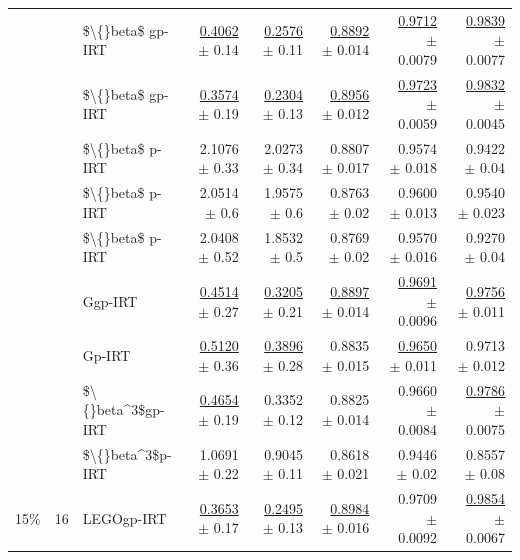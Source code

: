 \begin{longtable}{llp{}rrrrr}
 &  & \$\textbackslash\{\}beta\$ gp-IRT & \underline{0.4062} {\scriptsize $\pm$ 0.14} & \underline{0.2576} {\scriptsize $\pm$ 0.11} & \underline{0.8892} {\scriptsize $\pm$ 0.014} & \underline{0.9712} {\scriptsize $\pm$ 0.0079} & \underline{0.9839} {\scriptsize $\pm$ 0.0077} \\
 &  & \$\textbackslash\{\}beta\$ gp-IRT & \underline{0.3574} {\scriptsize $\pm$ 0.19} & \underline{0.2304} {\scriptsize $\pm$ 0.13} & \underline{0.8956} {\scriptsize $\pm$ 0.012} & \underline{0.9723} {\scriptsize $\pm$ 0.0059} & \underline{0.9832} {\scriptsize $\pm$ 0.0045} \\
 &  & \$\textbackslash\{\}beta\$ p-IRT & 2.1076 {\scriptsize $\pm$ 0.33} & 2.0273 {\scriptsize $\pm$ 0.34} & 0.8807 {\scriptsize $\pm$ 0.017} & 0.9574 {\scriptsize $\pm$ 0.018} & 0.9422 {\scriptsize $\pm$ 0.04} \\
 &  & \$\textbackslash\{\}beta\$ p-IRT & 2.0514 {\scriptsize $\pm$ 0.6} & 1.9575 {\scriptsize $\pm$ 0.6} & 0.8763 {\scriptsize $\pm$ 0.02} & 0.9600 {\scriptsize $\pm$ 0.013} & 0.9540 {\scriptsize $\pm$ 0.023} \\
 &  & \$\textbackslash\{\}beta\$ p-IRT & 2.0408 {\scriptsize $\pm$ 0.52} & 1.8532 {\scriptsize $\pm$ 0.5} & 0.8769 {\scriptsize $\pm$ 0.02} & 0.9570 {\scriptsize $\pm$ 0.016} & 0.9270 {\scriptsize $\pm$ 0.04} \\
 &  & Ggp-IRT & \underline{0.4514} {\scriptsize $\pm$ 0.27} & \underline{0.3205} {\scriptsize $\pm$ 0.21} & \underline{0.8897} {\scriptsize $\pm$ 0.014} & \underline{0.9691} {\scriptsize $\pm$ 0.0096} & \underline{0.9756} {\scriptsize $\pm$ 0.011} \\
 &  & Gp-IRT & \underline{0.5120} {\scriptsize $\pm$ 0.36} & \underline{0.3896} {\scriptsize $\pm$ 0.28} & 0.8835 {\scriptsize $\pm$ 0.015} & \underline{0.9650} {\scriptsize $\pm$ 0.011} & 0.9713 {\scriptsize $\pm$ 0.012} \\
 &  & \$\textbackslash\{\}beta\textasciicircum{}3\$gp-IRT & \underline{0.4654} {\scriptsize $\pm$ 0.19} & 0.3352 {\scriptsize $\pm$ 0.12} & 0.8825 {\scriptsize $\pm$ 0.014} & 0.9660 {\scriptsize $\pm$ 0.0084} & \underline{0.9786} {\scriptsize $\pm$ 0.0075} \\
 &  & \$\textbackslash\{\}beta\textasciicircum{}3\$p-IRT & 1.0691 {\scriptsize $\pm$ 0.22} & 0.9045 {\scriptsize $\pm$ 0.11} & 0.8618 {\scriptsize $\pm$ 0.021} & 0.9446 {\scriptsize $\pm$ 0.02} & 0.8557 {\scriptsize $\pm$ 0.08} \\
\midrule
15\% & 16 & LEGOgp-IRT & \underline{0.3653} {\scriptsize $\pm$ 0.17} & \underline{0.2495} {\scriptsize $\pm$ 0.13} & \underline{0.8984} {\scriptsize $\pm$ 0.016} & 0.9709 {\scriptsize $\pm$ 0.0092} & \underline{0.9854} {\scriptsize $\pm$ 0.0067} \\

\end{longtable}
